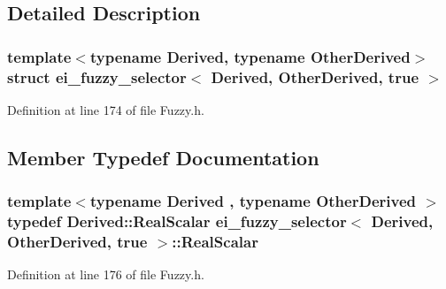 \subsection{Detailed Description}
\subsubsection*{template$<$typename Derived, typename Other\-Derived$>$struct ei\-\_\-fuzzy\-\_\-selector$<$ Derived, Other\-Derived, true $>$}



Definition at line 174 of file Fuzzy.\-h.



\subsection{Member Typedef Documentation}
\hypertarget{structei__fuzzy__selector_3_01_derived_00_01_other_derived_00_01true_01_4_afae0956bf57e87a08138b34642aafa82}{
\subsubsection[{Real\-Scalar}]{\setlength{\rightskip}{0pt plus 5cm}template$<$typename Derived , typename Other\-Derived $>$ typedef Derived\-::\-Real\-Scalar {\bf ei\-\_\-fuzzy\-\_\-selector}$<$ Derived, Other\-Derived, true $>$\-::{\bf Real\-Scalar}}}\label{structei__fuzzy__selector_3_01_derived_00_01_other_derived_00_01true_01_4_afae0956bf57e87a08138b34642aafa82}


Definition at line 176 of file Fuzzy.\-h.



